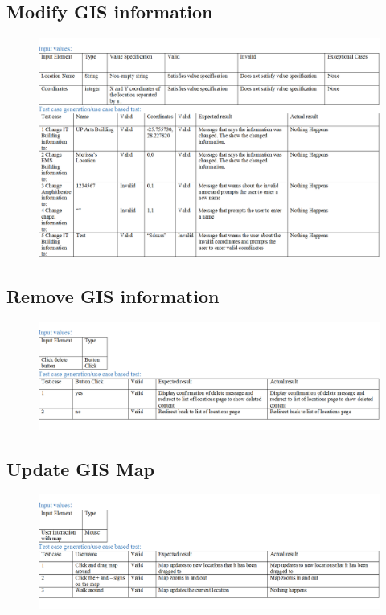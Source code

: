 \documentclass[english]{article}
\begin{document}
\subsection{Modify GIS information}
\begin{figure}[H]
\label{tab:example}
\hspace*{-2.5cm}
\includegraphics[width=180mm]{ModifyGISInformation.png}
\end{figure}
\subsection{Remove GIS information}
\begin{figure}[ht!]
\hspace*{-2.5cm}
\includegraphics[width=180mm]{DeleteGISInformation.png}
\end{figure}
\subsection{Update GIS Map}
\begin{figure}[H]
\hspace*{-2.5cm}
\includegraphics[width=180mm]{UpdateGISMap.png}
\end{figure}
\end{document}
